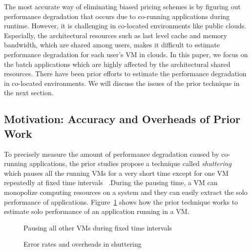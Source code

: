 \documentclass{sig-alternate}
\begin{document}
The most accurate way of eliminating biased pricing schemes is by figuring out performance degradation that occurs due to co-running applications during runtime. However, it is challenging in co-located environments like public clouds. Especially, the architectural resources such as last level cache and memory bandwidth, which are shared among users, makes it difficult to estimate performance degradation for each user's VM in clouds. 
In this paper, we focus on the batch applications which are highly affected by the architectural shared resources. There have been prior efforts to estimate the performance degradation in co-located environments. We will discuss the issues of the prior technique in the next section.
\subsection{Motivation: Accuracy and Overheads of Prior Work}
\label{subsec:Motivation:AccuracyandOverheadsofPriorWork}

To precisely measure the amount of performance degradation caused by co-running applications, the prior studies propose a technique called \textit{shuttering} which pauses all the running VMs for a very short time except for one VM repeatedly at fixed time intervals ~\cite{fairpricing, 6844481}.During the pausing time, a VM can monopolize computing resources on a system and they can easily extract the solo performance of applications.  Figure~\ref{fig:precise_shuttering} shows how the prior technique works to estimate solo performance of an application running in a VM.
\begin{figure}
\centering
\begin{minipage}[t]{1\columnwidth}
\centering
{}
\caption{Pausing all other VMs during fixed time intervals}
\label{fig:precise_shuttering}
\end{minipage}
\end{figure}
\begin{figure}
\centering
\begin{minipage}[t]{1\columnwidth}
\centering
{}
\caption{Error rates and overheads in shuttering\vspace{-0.25in}}
\label{fig:overheads_precise_shuttering}
\end{minipage}
\end{figure}
\end{document}

